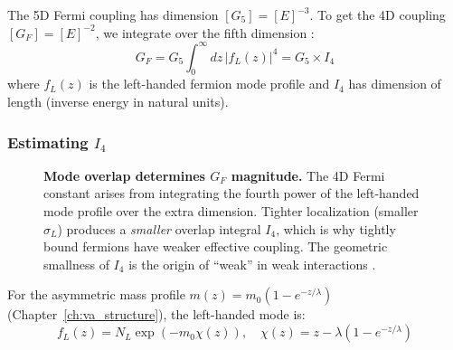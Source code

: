 The 5D Fermi coupling has dimension $[G_5] = [E]^{-3}$. To get the 4D coupling
$[G_F] = [E]^{-2}$, we integrate over the fifth dimension \tagDc{}:
\begin{equation}
    G_F = G_5 \int_0^\infty dz \, |f_L(z)|^4 = G_5 \times I_4
    \label{eq:ch11_overlap}
\end{equation}
where $f_L(z)$ is the left-handed fermion mode profile and $I_4$ has dimension
of length (inverse energy in natural units).

\subsubsection{Estimating $I_4$}

\begin{figure}[htbp]
\centering
{}
\caption{\textbf{Mode overlap determines $G_F$ magnitude.}
The 4D Fermi constant arises from integrating the fourth power of the
left-handed mode profile over the extra dimension. Tighter localization
(smaller $\sigma_L$) produces a \emph{smaller} overlap integral $I_4$,
which is why tightly bound fermions have weaker effective coupling.
The geometric smallness of $I_4$ is the origin of ``weak'' in weak
interactions \tagP{}.}
\label{fig:ch11_mode_overlap}
\end{figure}

For the asymmetric mass profile $m(z) = m_0(1 - e^{-z/\lambda})$
(Chapter~\ref{ch:va_structure}), the left-handed mode is:
\begin{equation}
    f_L(z) = N_L \exp\left(-m_0\chi(z)\right), \quad
    \chi(z) = z - \lambda(1 - e^{-z/\lambda})
    \label{eq:ch11_fL}
\end{equation}

